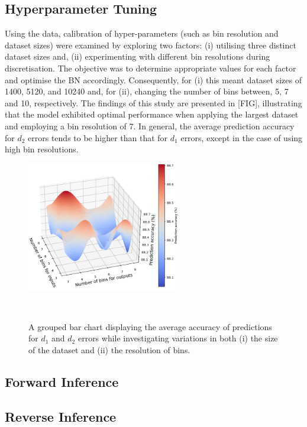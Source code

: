 \documentclass[journal]{IEEEtran}
\begin{document}
\subsection{Hyperparameter Tuning}\label{sec:res_hyperparameter}
Using the data, calibration of hyper-parameters (such as bin resolution and dataset sizes) were examined by exploring two factors: (i) utilising three distinct dataset sizes and, (ii) experimenting with different bin resolutions during discretisation. The objective was to determine appropriate values for each factor and optimise the BN accordingly. Consequently, for (i) this meant dataset sizes of 1400, 5120, and 10240 and, for (ii), changing the number of bins between, 5, 7 and 10, respectively. The findings of this study are presented in [FIG], illustrating that the model exhibited optimal performance when applying the largest dataset and employing a bin resolution of 7. In general, the average prediction accuracy for $d_{2}$ errors tends to be higher than that for $d_{1}$ errors, except in the case of using high bin resolutions.

\begin{figure}[h]
    \centering
    \includegraphics[width=0.6\textwidth]{figures/SA_3D_trimmed_39.png}
    \caption{\small A grouped bar chart displaying the average accuracy of predictions for $d_{1}$ and $d_{2}$ errors while investigating variations in both (i) the size of the dataset and (ii) the resolution of bins.}~\label{fig:3D_SA_trimmed_39_D1}
\end{figure}

\subsection{Forward Inference}\label{sec:res_forward}

\subsection{Reverse Inference}\label{sec:res_reverse}
\end{document}

